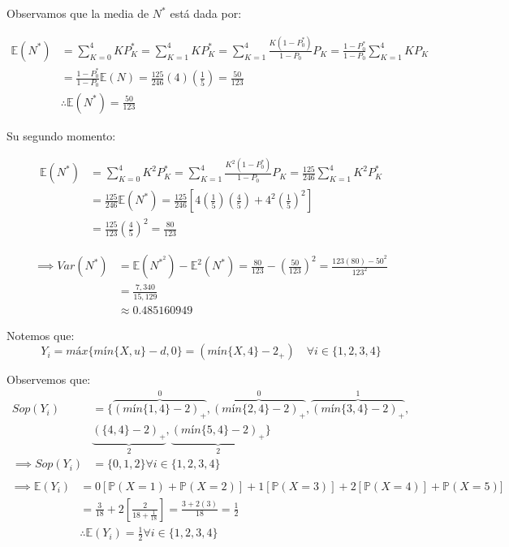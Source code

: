 \documentclass[
]{article}
\begin{document}
Observamos que la media de \(N^{*}\) está dada por:

\begin{align*}
\mathbb{E}(N^{*}) &= \sum_{K = 0}^{4}K P_{K}^{*} = \sum_{K = 1}^{4}K P_{K}^{*} = \sum_{K = 1}^{4}\frac{K(1 - P_{0}^{*})}{1 - P_{0}} P_{K} = \frac{1 - P_{0}^{*}}{1 - P_{0}} \sum_{K = 1}^{4}K P_{K}\\
&= \frac{1 - P_{0}^{*}}{1 - P_{0}}\mathbb{E}(N) = \frac{125}{246}(4)\left(\frac{1}{5}\right) = \frac{50}{123}\\
&\therefore \mathbb{E}(N^{*}) = \frac{50}{123}
\end{align*}

Su segundo momento:

\begin{align*}
\mathbb{E}(N^{*}) &= \sum_{K = 0}^{4}K^{2} P_{K}^{*} = \sum_{K = 1}^{4}\frac{K^{2}(1 - P_{0}^{*})}{1 - P_{0}} P_{K} = \frac{125}{246}\sum_{K = 1}^{4}K^{2} P_{K}^{*}\\
&= \frac{125}{246}\mathbb{E}(N^{*}) = \frac{125}{246}\left[4\left(\frac{1}{5}\right)\left(\frac{4}{5}\right) + 4^{2}\left(\frac{1}{5}\right)^{2}\right]\\
&= \frac{125}{123}\left(\frac{4}{5}\right)^{2} = \frac{80}{123}
\end{align*}

\begin{align*}
\implies Var(N^{*}) &= \mathbb{E}(N^{*^{2}}) - \mathbb{E}^{2}(N^{*}) = \frac{80}{123} - \left(\frac{50}{123}\right)^{2} = \frac{123(80) - 50^{2}}{123^{2}}\\
&= \frac{7,340}{15,129}\\
&\approx 0.485160949
\end{align*}

\underline{}

Notemos que:
\[Y_{i} = máx \{mín\{X,u\}-d,0\} = (mín \{X,4\} - 2_{+}) \quad \forall i \in \{1,2,3,4\}\]

Observemos que: \begin{align*}
Sop(Y_{i}) &= \{\overbrace{(mín\{1,4\} - 2)_{+}}^{0}, \overbrace{(mín\{2,4\} - 2)_{+}}^{0}, \overbrace{(mín\{3,4\}-2)_{+}}^{1},\\
&\underbrace{(\{4,4\}-2)_{+}}_{2}, \underbrace{(mín\{5,4\}-2)_{+}}_{2}\}\\
\implies Sop(Y_{i}) &= \{0,1,2\} \forall i \in \{1,2,3,4\}\\
\end{align*} \begin{align*}
\implies \mathbb{E}(Y_{i}) &= 0\left[\mathbb{P}(X = 1) + \mathbb{P}(X = 2)\right] + 1[\mathbb{P}(X = 3)] + 2[\mathbb{P}(X = 4)] + \mathbb{P}(X = 5)]\\
&= \frac{3}{18} + 2\left[\frac{2}{18 + \frac{1}{18}}\right] = \frac{3 + 2(3)}{18} = \frac{1}{2}\\
&\therefore \mathbb{E}(Y_{i}) = \frac{1}{2} \forall i \in \{1,2,3,4\}
\end{align*}
\end{document}
